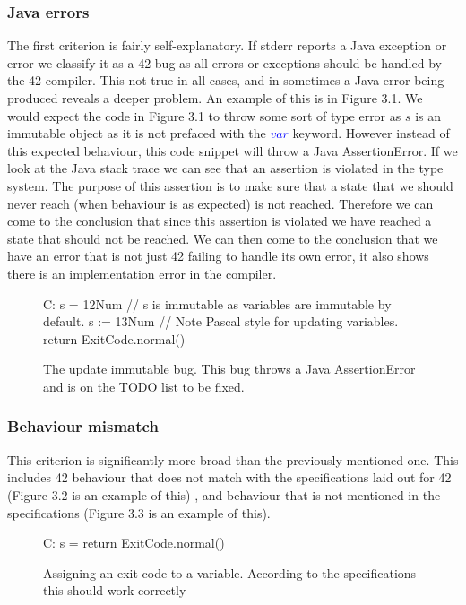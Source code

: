 \subsubsection{Java errors}
The first criterion is fairly self-explanatory. If stderr reports a Java exception or error we classify it as a 42 bug as all errors or exceptions should be handled by the 42 compiler. This not true in all cases, and in sometimes a Java error being produced reveals a deeper problem. An example of this is in Figure 3.1. We would expect the code in Figure 3.1 to throw some sort of type error as $s$ is an immutable object as it is not prefaced with the \textcolor{blue}{$var$} keyword. However instead of this expected behaviour, this code snippet will throw a Java AssertionError. If we look at the Java stack trace we can see that an assertion is violated in the type system. The purpose of this assertion is to make sure that a state that we should never reach (when behaviour is as expected) is not reached. Therefore we can come to the conclusion that since this assertion is violated we have reached a state that should not be reached. We can then come to the conclusion that we have an error that is not just 42 failing to handle its own error, it also shows there is an implementation error in the compiler.

\begin{figure}[H]
\begin{42listing}
	C: {
		s = 12Num // s is immutable as variables are immutable by default.
		s := 13Num // Note Pascal style for updating variables.
		return ExitCode.normal()
	}	
\end{42listing}
\captionsetup{format = hang}
\caption[Update immutable bug code]{The update immutable bug. This bug throws a Java AssertionError and is on the TODO list to be fixed.}
\end{figure}

\subsubsection{Behaviour mismatch}
This criterion is significantly more broad than the previously mentioned one. This includes 42 behaviour that does not match with the specifications laid out for 42 (Figure 3.2 is an example of this) \cite{L42}, and behaviour that is not mentioned in the specifications (Figure 3.3 is an example of this).

\begin{figure}[h]
\begin{42listing}
	C: {
		s = return ExitCode.normal()
	}
\end{42listing}
\captionsetup{format = hang}
\caption[Assigning an exit code to a variable]{Assigning an exit code to a variable. According to the specifications this should work correctly}
\end{figure}

